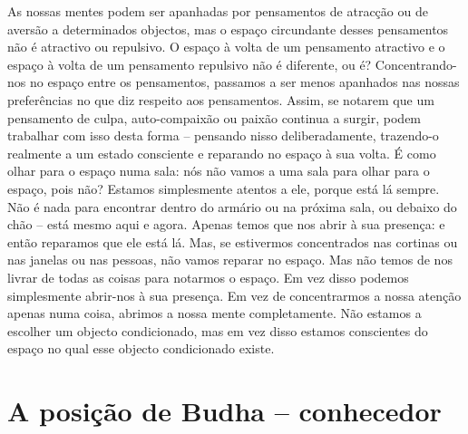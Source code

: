 As nossas mentes podem ser apanhadas por pensamentos de atracção ou de
aversão a determinados objectos, mas o espaço circundante desses
pensamentos não é atractivo ou repulsivo. O espaço à volta de um
pensamento atractivo e o espaço à volta de um pensamento repulsivo não é
diferente, ou é? Concentrando-nos no espaço entre os pensamentos,
passamos a ser menos apanhados nas nossas preferências no que diz
respeito aos pensamentos. Assim, se notarem que um pensamento de culpa,
auto-compaixão ou paixão continua a surgir, podem trabalhar com isso
desta forma -- pensando nisso deliberadamente, trazendo-o realmente a um
estado consciente e reparando no espaço à sua volta. É como olhar para o
espaço numa sala: nós não vamos a uma sala para olhar para o espaço,
pois não? Estamos simplesmente atentos a ele, porque está lá sempre. Não
é nada para encontrar dentro do armário ou na próxima sala, ou debaixo
do chão -- está mesmo aqui e agora. Apenas temos que nos abrir à sua
presença: e então reparamos que ele está lá. Mas, se estivermos
concentrados nas cortinas ou nas janelas ou nas pessoas, não vamos
reparar no espaço. Mas não temos de nos livrar de todas as coisas para
notarmos o espaço. Em vez disso podemos simplesmente abrir-nos à sua
presença. Em vez de concentrarmos a nossa atenção apenas numa coisa,
abrimos a nossa mente completamente. Não estamos a escolher um objecto
condicionado, mas em vez disso estamos conscientes do espaço no qual
esse objecto condicionado existe.

\section{A posição de Budha -- conhecedor}

